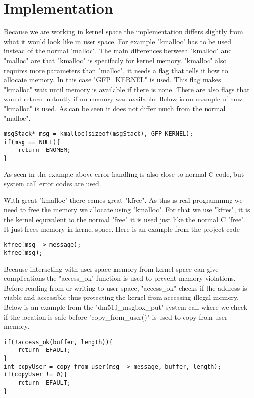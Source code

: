\documentclass[12pt,a4paper]{report}
\begin{document}
\section{Implementation}
Because we are working in kernel space the implementation differs slightly from what it would look like in user space. For example "kmalloc" has to be used instead of the normal "malloc". The main differences between "kmalloc" and "malloc" are that "kmalloc" is specifacly for kernel memory. "kmalloc" also requires more parameters than "malloc", it needs a flag that tells it how to allocate memory. In this case "GFP\_KERNEL" is used. This flag makes "kmalloc" wait until memory is available if there is none. There are also flags that would return instantly if no memory was available. Below is an example of how "kmalloc" is used. As can be seen it does not differ much from the normal "malloc".
\begin{verbatim}
msgStack* msg = kmalloc(sizeof(msgStack), GFP_KERNEL);
if(msg == NULL){
    return -ENOMEM;
}
\end{verbatim}
As seen in the example above error handling is also close to normal C code, but system call error codes are used.

With great "kmalloc" there comes great "kfree". As this is real programming we need to free the memory we allocate using "kmalloc". For that we use "kfree", it is the kernel equivalent to the normal "free" it is used just like the normal C "free". It just frees memory in kernel space. Here is an example from the project code
\begin{verbatim}
kfree(msg -> message);
kfree(msg);
\end{verbatim}
Because interacting with user space memory from kernel space can give complications the "access\_ok" function is used to prevent memory violations. Before reading from or writing to user space, "access\_ok" checks if the address is viable and accessible thus protecting the kernel from accessing illegal memory. Below is an example from the "dm510\_msgbox\_put" system call where we check if the location is safe before "copy\_from\_user()" is used to copy from user memory.
\begin{verbatim}
if(!access_ok(buffer, length)){
    return -EFAULT;
}
int copyUser = copy_from_user(msg -> message, buffer, length);
if(copyUser != 0){
    return -EFAULT;
}
\end{verbatim}
\end{document}
